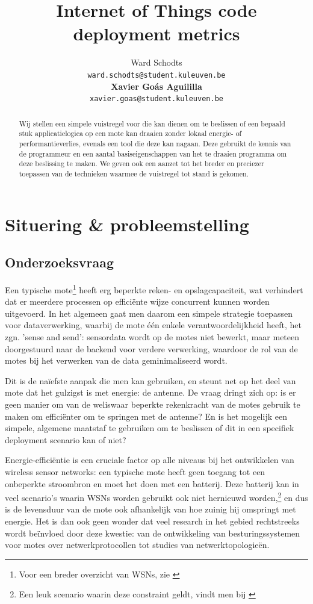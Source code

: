 \documentclass{article}
\title{Internet of Things code deployment metrics}
\author{
  Ward Schodts\\
  \texttt{ward.schodts@student.kuleuven.be}
  \\[3ex]
  \textbf{Xavier Go\'as Aguililla}\\
  \texttt{xavier.goas@student.kuleuven.be}
}
\begin{document}
\maketitle

\linespread{1.3}
\begin{abstract}
Wij stellen een simpele vuistregel voor die kan dienen om te beslissen of een
bepaald stuk applicatielogica op een mote kan draaien zonder lokaal energie- of
performantieverlies, evenals een tool die deze kan nagaan. Deze gebruikt de
kennis van de programmeur en een aantal basiseigenschappen van het te draaien
programma om deze beslissing te maken. We geven ook een aanzet tot het breder en
preciezer toepassen van de technieken waarmee de vuistregel tot stand is gekomen.
  
\end{abstract}

\section{Situering \& probleemstelling}

\subsection{Onderzoeksvraag}

Een typische mote\footnote{Voor een breder overzicht van WSNs, zie
\cite{akyildiz2002wireless}} heeft erg beperkte reken- en opslagcapaciteit, wat
verhindert dat er meerdere processen op effici\"ente wijze concurrent kunnen
worden uitgevoerd. In het algemeen gaat men daarom een simpele strategie
toepassen voor dataverwerking, waarbij de mote \'e\'en enkele
verantwoordelijkheid heeft, het zgn. 'sense and send': sensordata wordt op de
motes niet bewerkt, maar meteen doorgestuurd naar de backend voor verdere
verwerking, waardoor de rol van de motes bij het verwerken van de data
geminimaliseerd wordt.

Dit is de na\"iefste aanpak die men kan gebruiken, en steunt net op het deel van
mote dat het gulzigst is met energie: de antenne.  De vraag dringt zich op: is
er geen manier om van de weliswaar beperkte rekenkracht van de motes gebruik te
maken om effici\"enter om te springen met de antenne? En is het mogelijk een
simpele, algemene maatstaf te gebruiken om te beslissen of dit in een specifiek
deployment scenario kan of niet?

Energie-effici\"entie is een cruciale factor op alle niveaus bij het ontwikkelen
van wireless sensor networks: een typische mote heeft geen toegang tot een
onbeperkte stroombron en moet het doen met een batterij. Deze batterij kan in
veel scenario's waarin WSNs worden gebruikt ook niet hernieuwd
worden,\footnote{Een leuk scenario waarin deze constraint geldt, vindt men bij
\cite{mainwaring2002wireless}} en dus is de levensduur van de mote ook
afhankelijk van hoe zuinig hij omspringt met energie. Het is dan ook geen wonder
dat veel research in het gebied rechtstreeks wordt be\"invloed door deze
kwestie: van de ontwikkeling van besturingssystemen voor motes over
netwerkprotocollen tot studies van netwerktopologie\"en.
\end{document}
